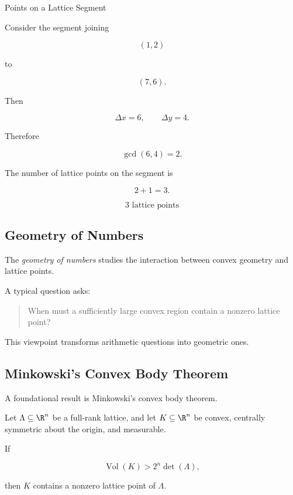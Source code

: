\begin{workedexamplebox}{Points on a Lattice Segment}

Consider the segment joining

\[
(1,2)
\]

to

\[
(7,6).
\]

Then

\[
\Delta x=6,
\qquad
\Delta y=4.
\]

Therefore

\[
\gcd(6,4)=2.
\]

The number of lattice points on the segment is

\[
2+1=3.
\]

\begin{answerbox}
\[
\boxed{3\text{ lattice points}}
\]
\end{answerbox}
\end{workedexamplebox}

\subsection{Geometry of Numbers}
\label{subsec:geometry-of-numbers}

The \emph{geometry of numbers} studies the interaction between convex
geometry and lattice points.

A typical question asks:

\begin{quote}
When must a sufficiently large convex region contain a nonzero lattice
point?
\end{quote}

This viewpoint transforms arithmetic questions into geometric ones.

\subsection{Minkowski's Convex Body Theorem}
\label{subsec:minkowski-convex-body-theorem}

A foundational result is Minkowski's convex body theorem.

\begin{theorem}
Let \(\Lambda\subseteq\R^n\) be a full-rank lattice, and let
\(K\subseteq\R^n\) be convex, centrally symmetric about the origin, and
measurable.

If

\[
\boxed{
\operatorname{Vol}(K)
>
2^n\det(\Lambda),
}
\]

then \(K\) contains a nonzero lattice point of \(\Lambda\).
\end{theorem}

